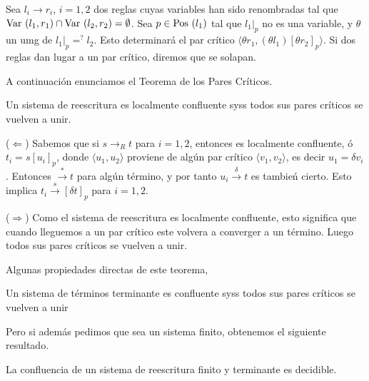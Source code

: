 \begin{defi}
  Sea $l_i \rightarrow r_i$, $i = 1,2$ dos reglas cuyas variables han
  sido renombradas tal que
  $\mbox{Var }(l_1,r_1) \cap \mbox{Var }(l_2,r_2) = \emptyset$. Sea
  $p \in \mbox{Pos }(l_1)$ tal que $l_1|_p$ no es una variable, y $\theta$ un
  umg de $l_1|_p =^? l_2$. Esto determinará el par crítico $\langle
  \theta r_1, (\theta l_1) [\theta r_2 ]_p \rangle$.
  Si dos reglas dan lugar a un par crítico, diremos que se solapan.
\end{defi}


A continuación enunciamos el Teorema de los Pares Críticos.
\begin{teor}
  Un sistema de reescritura es localmente confluente syss todos sus
  pares críticos se vuelven a unir.
\end{teor}

\begin{demo}
  ($\Leftarrow$) Sabemos que si $s \rightarrow_R t$ para $i = 1,2$,
  entonces es localmente confluente, ó $t_i = s[u_i]_p$, donde
  $\langle u_1, u_2 \rangle$ proviene de algún par crítico
  $\langle v_1, v_2 \rangle$, es decir $u_1 = \delta v_i$. Entonces
  $\xrightarrow{*}t$ para algún término, y por tanto
  $u_i \xrightarrow \delta t$ es tambień cierto. Esto implica
  $t_i \xrightarrow s[\delta t]_p$ para $i = 1,2$.

  ($\Rightarrow$) Como el sistema de reescritura es localmente
  confluente, esto significa que cuando lleguemos a un par crítico
  este volvera a converger a un término. Luego todos sus pares
  críticos se vuelven a unir.
\end{demo}

Algunas propiedades directas de este teorema,

\begin{coro}\label{parcritcor}
  Un sistema de términos terminante es confluente syss todos sus pares
  críticos se vuelven a unir
\end{coro}

Pero si además pedimos que sea un sistema finito, obtenemos el
siguiente resultado.

\begin{coro}
  La confluencia de un sistema de reescritura finito y terminante es
  decidible.
\end{coro}

